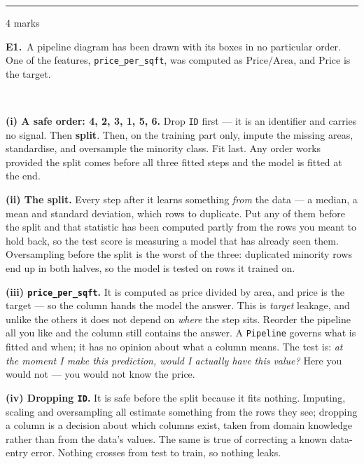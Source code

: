 \documentclass[10pt,a4paper]{article}
\newcommand{\parthead}[2]{\vspace{2pt}\noindent\rule{\linewidth}{0.4pt}\par\vspace{2pt}%
  \noindent{\bfseries Part #1}\hfill{\small #2}\par\vspace{1pt}}
\begin{document}
\newpage

\parthead{E --- Reasoning}{4 marks}

\textbf{E1.}\ A pipeline diagram has been drawn with its boxes in no particular order. One of the features,
\texttt{price\_per\_sqft}, was computed as $\text{Price}/\text{Area}$, and $\text{Price}$ is the target.

\vspace{2mm}
\begin{center}\small
{} \quad {} \quad {}\\[3pt]
 \quad {} \quad {}
\end{center}

\vspace{4pt}

\textbf{(i) A safe order: 4, 2, 3, 1, 5, 6.} Drop \texttt{ID} first --- it is an identifier and carries no signal. Then \textbf{split}. Then, on the training part only, impute the missing areas, standardise, and oversample the minority class. Fit last. Any order works provided the split comes before all three fitted steps and the model is fitted at the end.\par\vspace{1mm}\textbf{(ii) The split.} Every step after it learns something \emph{from} the data --- a median, a mean and standard deviation, which rows to duplicate. Put any of them before the split and that statistic has been computed partly from the rows you meant to hold back, so the test score is measuring a model that has already seen them. Oversampling before the split is the worst of the three: duplicated minority rows end up in both halves, so the model is tested on rows it trained on.\par\vspace{1mm}\textbf{(iii) \texttt{price\_per\_sqft}.} It is computed as price divided by area, and price is the target --- so the column hands the model the answer. This is \emph{target} leakage, and unlike the others it does not depend on \emph{where} the step sits. Reorder the pipeline all you like and the column still contains the answer. A \texttt{Pipeline} governs what is fitted and when; it has no opinion about what a column means. The test is: \emph{at the moment I make this prediction, would I actually have this value?} Here you would not --- you would not know the price.\par\vspace{1mm}\textbf{(iv) Dropping \texttt{ID}.} It is safe before the split because it fits nothing. Imputing, scaling and oversampling all estimate something from the rows they see; dropping a column is a decision about which columns exist, taken from domain knowledge rather than from the data's values. The same is true of correcting a known data-entry error. Nothing crosses from test to train, so nothing leaks.
\end{document}
